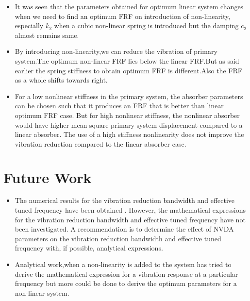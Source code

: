 \begin{itemize}
\item It was seen that the parameters obtained for optimum linear system changes when we need to find an optimum FRF on introduction of non-linearity, especially $k_2$ when a cubic non-linear spring is introduced but the damping $c_2$ almost remains same.

\item By introducing non-linearity,we can reduce the vibration of primary system.The optimum non-linear FRF lies below the linear FRF.But as said earlier the spring stiffness to obtain optimum FRF is different.Also the FRF as a whole shifts towards right.

\item For a low nonlinear stiffness in the primary system, the absorber parameters can be chosen such that it produces an FRF that is better than linear optimum FRF case. But for high nonlinear stiffness, the nonlinear absorber would have higher mean square primary system displacement compared to a linear absorber. The use of a high stiffness nonlinearity does not improve the vibration reduction compared to the linear absorber case. 
\end{itemize}

\section{Future Work}
\begin{itemize}
\item The numerical results for the vibration reduction bandwidth and effective tuned frequency have been obtained . However, the mathematical expressions for the vibration reduction bandwidth and effective tuned frequency have not been investigated. A recommendation is to determine the effect of NVDA parameters on the vibration reduction bandwidth and effective tuned frequency with, if possible, analytical expressions. 

\item Analytical work,when a non-linearity is added to the system has tried to derive the mathematical expression for a vibration response at a particular frequency but more could be done to derive the optimum parameters for a non-linear system.
\end{itemize}
%